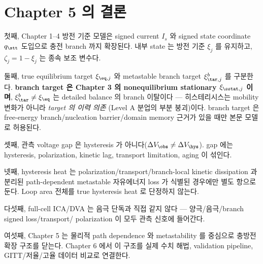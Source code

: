 \section{Chapter 5 의 결론}\label{sec:ch5_concl}
첫째, Chapter 1--4 방전 기준 모델은 signed current $I_s$ 와 signed state coordinate $q_\stt$ 도입으로 충전
branch 까지 확장된다. 내부 state 는 방전 기준 $\xi_j$ 를 유지하고, $\zeta_j=1-\xi_j$ 는 종속 보조 변수다.

둘째, true equilibrium target $\xi_{\eq,j}$ 와 metastable branch target $\xi_{\tar,j}^b$ 를 구분한다.
\textbf{branch target 은 Chapter 3 의 nonequilibrium stationary $\xi_{\sstat,j}$ 이며}, $\xi_{\tar}^b\ne\xi_{\eq}$
는 detailed balance 의 branch 이탈이다 — 히스테리시스는 mobility 변화가 아니라 \emph{target 의 이력 의존}
(Level A 분업의 부분 붕괴)이다. branch target 은 free-energy branch/nucleation barrier/domain memory 근거가
있을 때만 본문 모델로 허용된다.

셋째, 관측 voltage gap 은 hysteresis 가 아니다($\Delta V_\obs\ne\Delta V_\hys$). gap 에는 hysteresis,
polarization, kinetic lag, transport limitation, aging 이 섞인다.

넷째, hysteresis heat 는 polarization/transport/branch-local kinetic dissipation 과 분리된 path-dependent
metastable 자유에너지 loss 가 식별된 경우에만 별도 항으로 둔다. Loop area 전체를 true hysteresis heat 로
단정하지 않는다.

다섯째, full-cell ICA/DVA 는 음극 단독과 직접 같지 않다 — 양극/음극/branch signed loss/transport/
polarization 이 모두 관측 신호에 들어간다.

여섯째, Chapter 5 는 물리적 path dependence 와 metastability 를 중심으로 충방전 확장 구조를 닫는다.
Chapter 6 에서 이 구조를 실제 수치 해법, validation pipeline, GITT/저율/고율 데이터 비교로 연결한다.


